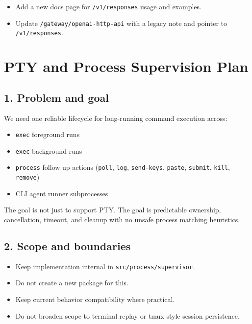 \begin{itemize}
  \item Add a new docs page for \texttt{/v1/responses} usage and examples.
  \item Update \texttt{/gateway/openai-http-api} with a legacy note and pointer to \texttt{/v1/responses}.
\end{itemize}



\clearpage

\section{PTY and Process Supervision Plan}


\subsection{1. Problem and goal}


We need one reliable lifecycle for long-running command execution across:

\begin{itemize}
  \item \texttt{exec} foreground runs
  \item \texttt{exec} background runs
  \item \texttt{process} follow up actions (\texttt{poll}, \texttt{log}, \texttt{send-keys}, \texttt{paste}, \texttt{submit}, \texttt{kill}, \texttt{remove})
  \item CLI agent runner subprocesses
\end{itemize}


The goal is not just to support PTY. The goal is predictable ownership, cancellation, timeout, and cleanup with no unsafe process matching heuristics.

\subsection{2. Scope and boundaries}


\begin{itemize}
  \item Keep implementation internal in \texttt{src/process/supervisor}.
  \item Do not create a new package for this.
  \item Keep current behavior compatibility where practical.
  \item Do not broaden scope to terminal replay or tmux style session persistence.
\end{itemize}


